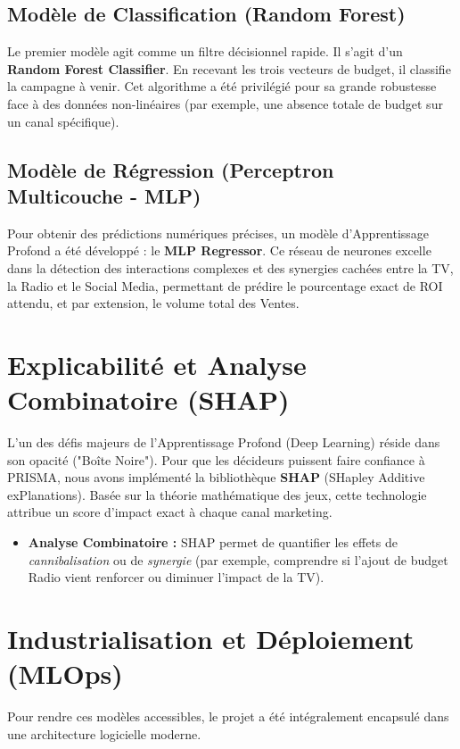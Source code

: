 \documentclass[a4paper,12pt]{article}
\begin{document}
\subsection{Modèle de Classification (Random Forest)}
Le premier modèle agit comme un filtre décisionnel rapide. Il s'agit d'un \textbf{Random Forest Classifier}. 
En recevant les trois vecteurs de budget, il classifie la campagne à venir. Cet algorithme a été privilégié pour sa grande robustesse face à des données non-linéaires (par exemple, une absence totale de budget sur un canal spécifique).

\subsection{Modèle de Régression (Perceptron Multicouche - MLP)}
Pour obtenir des prédictions numériques précises, un modèle d'Apprentissage Profond a été développé : le \textbf{MLP Regressor}. 
Ce réseau de neurones excelle dans la détection des interactions complexes et des synergies cachées entre la TV, la Radio et le Social Media, permettant de prédire le pourcentage exact de ROI attendu, et par extension, le volume total des Ventes.

\section{Explicabilité et Analyse Combinatoire (SHAP)}
L'un des défis majeurs de l'Apprentissage Profond (Deep Learning) réside dans son opacité ("Boîte Noire"). Pour que les décideurs puissent faire confiance à PRISMA, nous avons implémenté la bibliothèque \textbf{SHAP} (SHapley Additive exPlanations). 
Basée sur la théorie mathématique des jeux, cette technologie attribue un score d'impact exact à chaque canal marketing. 
\begin{itemize}
    \item \textbf{Analyse Combinatoire :} SHAP permet de quantifier les effets de \textit{cannibalisation} ou de \textit{synergie} (par exemple, comprendre si l'ajout de budget Radio vient renforcer ou diminuer l'impact de la TV).
\end{itemize}

\section{Industrialisation et Déploiement (MLOps)}
Pour rendre ces modèles accessibles, le projet a été intégralement encapsulé dans une architecture logicielle moderne.
\end{document}
